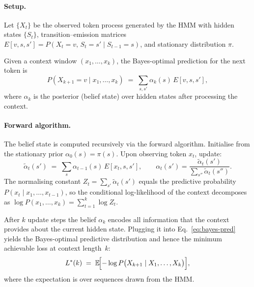 \documentclass[11pt]{article}
\begin{document}
\paragraph{Setup.}
Let $\{X_t\}$ be the observed token process generated by the HMM with
hidden states $\{S_t\}$, transition--emission matrices
$E[v,s,s'] = P(X_t{=}v,\, S_t{=}s' \mid S_{t-1}{=}s)$, and stationary
distribution $\pi$.

Given a context window $(x_1,\dots,x_k)$, the Bayes-optimal prediction
for the next token is
\begin{equation}\label{eq:bayes-pred}
  P(X_{k+1}{=}v \mid x_1,\dots,x_k)
  \;=\; \sum_{s,s'} \alpha_k(s)\, E[v,s,s'],
\end{equation}
where $\alpha_k$ is the posterior (belief state) over hidden states after
processing the context.

\paragraph{Forward algorithm.}
The belief state is computed recursively via the forward algorithm.
Initialise from the stationary prior $\alpha_0(s) = \pi(s)$.  Upon
observing token $x_t$, update:
\begin{equation}\label{eq:forward}
  \tilde{\alpha}_t(s')
  \;=\; \sum_s \alpha_{t-1}(s)\, E[x_t, s, s'],
  \qquad
  \alpha_t(s') = \frac{\tilde{\alpha}_t(s')}
                      {\displaystyle\sum_{s''}\tilde{\alpha}_t(s'')}.
\end{equation}
The normalising constant $Z_t = \sum_{s'}\tilde{\alpha}_t(s')$ equals
the predictive probability $P(x_t \mid x_1,\dots,x_{t-1})$, so the
conditional log-likelihood of the context decomposes as
$\log P(x_1,\dots,x_k) = \sum_{t=1}^{k} \log Z_t$.

After $k$ update steps the belief $\alpha_k$ encodes all information
that the context provides about the current hidden state.  Plugging it
into Eq.~\eqref{eq:bayes-pred} yields the Bayes-optimal predictive
distribution and hence the minimum achievable loss at context length~$k$:
\begin{equation}\label{eq:Lstar}
  L^{*}(k)
  \;=\; \mathbb{E}\!\Bigl[
    -\log P\bigl(X_{k+1} \mid X_1,\dots,X_k\bigr)
  \Bigr],
\end{equation}
where the expectation is over sequences drawn from the HMM\@.
\end{document}
